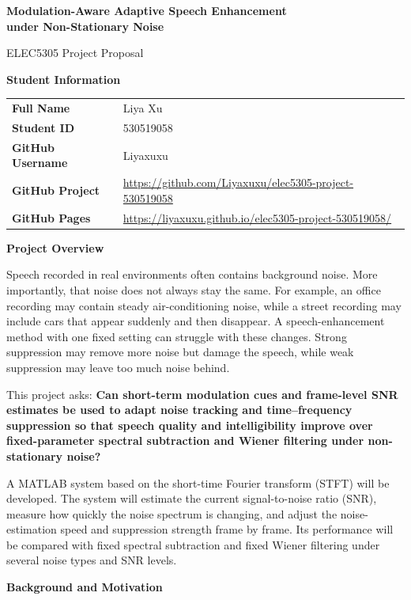 \documentclass[11pt,a4paper]{article}
\newcommand{\projectsection}[1]{%
  \vspace{0.3em}%
  {\large\bfseries\color{accent} #1}\par
  \vspace{0.15em}%
}
\begin{document}
\begin{center}
  {\LARGE\bfseries\color{textgray}
  Modulation-Aware Adaptive Speech Enhancement\\
  under Non-Stationary Noise\par}
  \vspace{0.8em}
  {\large ELEC5305 Project Proposal}
\end{center}

\projectsection{Student Information}

\begin{tabularx}{\textwidth}{@{}>{\bfseries}l X@{}}
Full Name & Liya Xu \\
Student ID & 530519058 \\
GitHub Username & Liyaxuxu \\
GitHub Project & {\small\url{https://github.com/Liyaxuxu/elec5305-project-530519058}} \\[0.35em]
GitHub Pages & {\small\url{https://liyaxuxu.github.io/elec5305-project-530519058/}} \\
\end{tabularx}

\projectsection{Project Overview}

Speech recorded in real environments often contains background noise. More importantly, that noise does not always stay the same. For example, an office recording may contain steady air-conditioning noise, while a street recording may include cars that appear suddenly and then disappear. A speech-enhancement method with one fixed setting can struggle with these changes. Strong suppression may remove more noise but damage the speech, while weak suppression may leave too much noise behind.

This project asks: \textbf{Can short-term modulation cues and frame-level SNR estimates be used to adapt noise tracking and time--frequency suppression so that speech quality and intelligibility improve over fixed-parameter spectral subtraction and Wiener filtering under non-stationary noise?}

A MATLAB system based on the short-time Fourier transform (STFT) will be developed. The system will estimate the current signal-to-noise ratio (SNR), measure how quickly the noise spectrum is changing, and adjust the noise-estimation speed and suppression strength frame by frame. Its performance will be compared with fixed spectral subtraction and fixed Wiener filtering under several noise types and SNR levels.

\projectsection{Background and Motivation}
\end{document}
